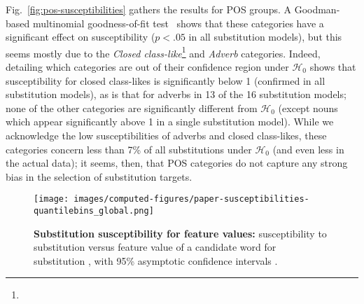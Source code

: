 \begin{new}

Fig.~\ref{fig:pos-susceptibilities} gathers the results for POS groups.
A Goodman-based multinomial goodness-of-fit test~\citep{goodman_simultaneous_1965} shows that these categories have a significant effect on susceptibility ($p < .05$ in all substitution models), but this seems mostly due to the \emph{Closed class-like}\footnote{
}
and \emph{Adverb} categories.
Indeed, detailing which categories are out of their confidence region under $\mathcal{H}_0$ shows that susceptibility for closed class-likes is significantly below 1 (confirmed in all substitution models), as is that for adverbs in 13 of the 16 substitution models;
none of the other categories are significantly different from $\mathcal{H}_0$ (except nouns which appear significantly above 1 in a single substitution model).
While we acknowledge the low susceptibilities of adverbs and closed class-likes, these categories concern less than 7\% of all substitutions under $\mathcal{H}_0$ (and even less in the actual data);
it seems, then, that POS categories do not capture any strong bias in the selection of substitution targets.

\end{new}

\begin{figure*}[!th]
    \centering
    \texttt{[image: images/computed-figures/paper-susceptibilities-quantilebins\_global.png]}
    \caption{\textbf{Substitution susceptibility for feature values:}
    susceptibility to substitution versus feature value of a candidate word for substitution , with 95\% asymptotic confidence intervals .
    }
    \label{fig:feature-susceptibilities-global}
\end{figure*}

